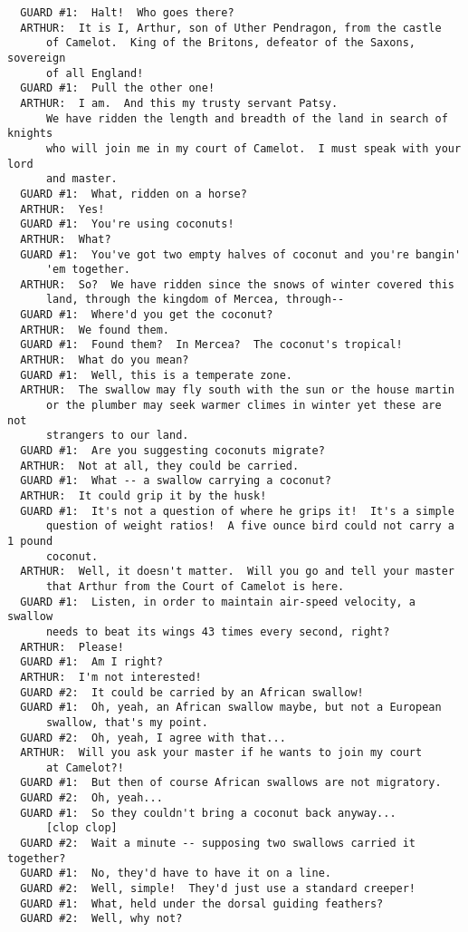 \documentclass{article}
\begin{document}
\begin{verbatim}
  GUARD #1:  Halt!  Who goes there?
  ARTHUR:  It is I, Arthur, son of Uther Pendragon, from the castle
      of Camelot.  King of the Britons, defeator of the Saxons, sovereign
      of all England!
  GUARD #1:  Pull the other one!
  ARTHUR:  I am.  And this my trusty servant Patsy.
      We have ridden the length and breadth of the land in search of knights
      who will join me in my court of Camelot.  I must speak with your lord
      and master.
  GUARD #1:  What, ridden on a horse?
  ARTHUR:  Yes!
  GUARD #1:  You're using coconuts!
  ARTHUR:  What?
  GUARD #1:  You've got two empty halves of coconut and you're bangin'
      'em together.
  ARTHUR:  So?  We have ridden since the snows of winter covered this
      land, through the kingdom of Mercea, through--
  GUARD #1:  Where'd you get the coconut?
  ARTHUR:  We found them.
  GUARD #1:  Found them?  In Mercea?  The coconut's tropical!
  ARTHUR:  What do you mean?
  GUARD #1:  Well, this is a temperate zone.
  ARTHUR:  The swallow may fly south with the sun or the house martin
      or the plumber may seek warmer climes in winter yet these are not
      strangers to our land.
  GUARD #1:  Are you suggesting coconuts migrate?
  ARTHUR:  Not at all, they could be carried.
  GUARD #1:  What -- a swallow carrying a coconut?
  ARTHUR:  It could grip it by the husk!
  GUARD #1:  It's not a question of where he grips it!  It's a simple
      question of weight ratios!  A five ounce bird could not carry a 1 pound
      coconut.
  ARTHUR:  Well, it doesn't matter.  Will you go and tell your master
      that Arthur from the Court of Camelot is here.
  GUARD #1:  Listen, in order to maintain air-speed velocity, a swallow
      needs to beat its wings 43 times every second, right?
  ARTHUR:  Please!
  GUARD #1:  Am I right?
  ARTHUR:  I'm not interested!
  GUARD #2:  It could be carried by an African swallow!
  GUARD #1:  Oh, yeah, an African swallow maybe, but not a European
      swallow, that's my point.
  GUARD #2:  Oh, yeah, I agree with that...
  ARTHUR:  Will you ask your master if he wants to join my court
      at Camelot?!
  GUARD #1:  But then of course African swallows are not migratory.
  GUARD #2:  Oh, yeah...
  GUARD #1:  So they couldn't bring a coconut back anyway...
      [clop clop]
  GUARD #2:  Wait a minute -- supposing two swallows carried it together?
  GUARD #1:  No, they'd have to have it on a line.
  GUARD #2:  Well, simple!  They'd just use a standard creeper!
  GUARD #1:  What, held under the dorsal guiding feathers?
  GUARD #2:  Well, why not?


\end{verbatim}
\end{document}
